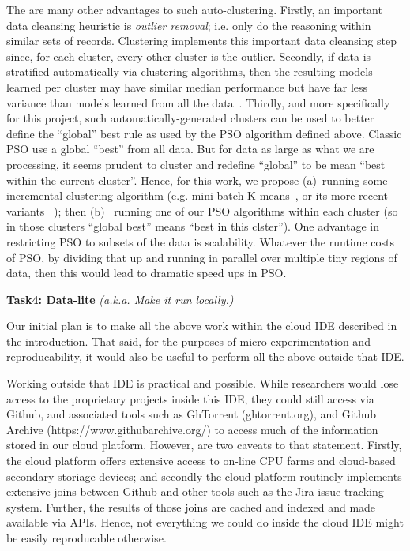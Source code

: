 The are many other advantages to such auto-clustering.
Firstly, an important data cleansing heuristic is {\em outlier removal}; i.e. only do the reasoning within
similar sets of records. Clustering implements this important data cleansing step since, for each cluster, every other cluster is the outlier.
Secondly,
if data is stratified automatically via clustering algorithms,
then the resulting models learned per cluster may have similar median performance but
have far less variance than models learned from all the data~\cite{Me13}. 
Thirdly, and
more specifically for this project, such automatically-generated clusters can be used to better define the ``global'' best rule as used by the PSO algorithm defined above. Classic PSO use a global ``best'' from all data. But for data as large as what we are processing, it seems prudent to cluster and redefine ``global'' to be mean ``best within the current cluster''.  Hence, for this work, we propose (a)~running
some incremental clustering algorithm (e.g. mini-batch K-means~\cite{Sculley:2010}, or its
more recent variants ~\cite{Sculley:2010}); then (b)~  running one of our PSO algorithms within each cluster (so in those clusters ``global best'' means ``best in this clster'').
One advantage in restricting PSO to subsets of the data is scalability. Whatever the runtime costs of PSO, by dividing that up and running
in parallel over multiple
tiny regions of data, then this would lead to dramatic speed ups in PSO.

\noindent
{\bf Task4: Data-lite} {\em (a.k.a. Make it run locally.)}

Our initial plan is to make all the above work within the cloud IDE
described in the introduction. That said, for the purposes of micro-experimentation and reproducability,
it would also be useful to perform all the above outside that IDE.

Working outside that IDE is practical and possible. While researchers would lose access to the proprietary projects inside this IDE, they could still access via Github, and associated tools
such as  GhTorrent (ghtorrent.org), and 
Github Archive (https://www.githubarchive.org/) to access much of the information stored in our
cloud platform. However,  are two caveats to that statement. Firstly,
the cloud platform offers extensive access to on-line CPU farms and cloud-based secondary storiage devices; and secondly 
the cloud platform routinely implements extensive joins between Github and other tools  such as the
Jira issue tracking system. Further, the results of those joins are cached and indexed
and made available via APIs. 
Hence, not everything we could do inside the cloud IDE might be 
easily reproducable otherwise. 

